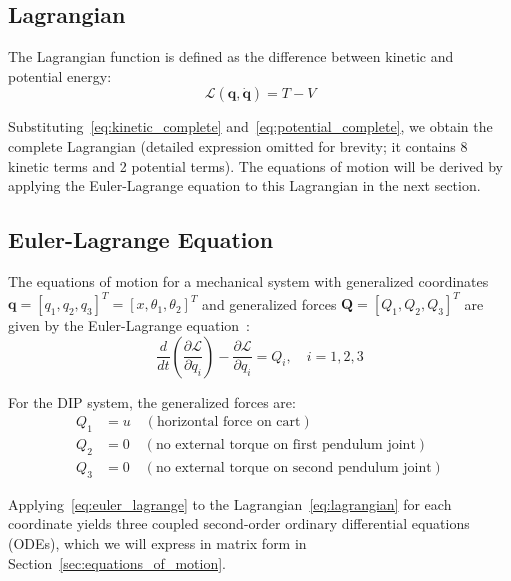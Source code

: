 \subsection{Lagrangian}

The Lagrangian function is defined as the difference between kinetic and potential energy:
\begin{equation}
\mathcal{L}(\mathbf{q}, \dot{\mathbf{q}}) = T - V
\label{eq:lagrangian}
\end{equation}

Substituting~\eqref{eq:kinetic_complete} and~\eqref{eq:potential_complete}, we obtain the complete Lagrangian (detailed expression omitted for brevity; it contains 8 kinetic terms and 2 potential terms). The equations of motion will be derived by applying the Euler-Lagrange equation to this Lagrangian in the next section.

\subsection{Euler-Lagrange Equation}

The equations of motion for a mechanical system with generalized coordinates $\mathbf{q} = [q_1, q_2, q_3]^T = [x, \theta_1, \theta_2]^T$ and generalized forces $\mathbf{Q} = [Q_1, Q_2, Q_3]^T$ are given by the Euler-Lagrange equation~\cite{goldstein2002classical}:
\begin{equation}
\frac{d}{dt}\left(\frac{\partial \mathcal{L}}{\partial \dot{q}_i}\right) - \frac{\partial \mathcal{L}}{\partial q_i} = Q_i, \quad i = 1, 2, 3
\label{eq:euler_lagrange}
\end{equation}

For the DIP system, the generalized forces are:
\begin{align}
Q_1 &= u \quad (\text{horizontal force on cart}) \label{eq:gen_force_cart} \\
Q_2 &= 0 \quad (\text{no external torque on first pendulum joint}) \label{eq:gen_force_pend1} \\
Q_3 &= 0 \quad (\text{no external torque on second pendulum joint}) \label{eq:gen_force_pend2}
\end{align}

Applying~\eqref{eq:euler_lagrange} to the Lagrangian~\eqref{eq:lagrangian} for each coordinate yields three coupled second-order ordinary differential equations (ODEs), which we will express in matrix form in Section~\ref{sec:equations_of_motion}.

